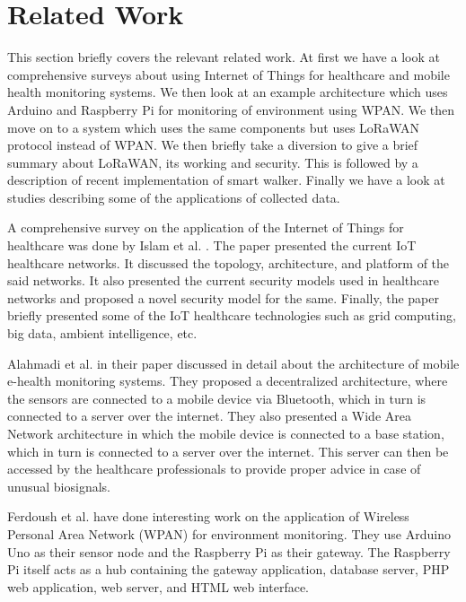 \chapter{Related Work}
\label{cha:related-work}

This section briefly covers the relevant related work. At first we have a look at comprehensive surveys about using Internet of Things for healthcare and mobile health monitoring systems. We then look at an example architecture which uses Arduino and Raspberry Pi for monitoring of environment using WPAN. We then move on to a system which uses the same components but uses LoRaWAN protocol instead of WPAN. We then briefly take a diversion to give a brief summary about LoRaWAN, its working and security. This is followed by a description of recent implementation of smart walker. Finally we have a look at studies describing some of the applications of collected data. 


A comprehensive survey on the application of the Internet of Things for healthcare was done by Islam et al. \cite{islam2015internet}. The paper presented the current IoT healthcare networks. It discussed the topology, architecture, and platform of the said networks. It also presented the current security models used in healthcare networks and proposed a novel security model for the same. Finally, the paper briefly presented some of the IoT healthcare technologies such as grid computing, big data, ambient intelligence, etc.

Alahmadi et al. \cite{alahmadi2011smart} in their paper discussed in detail about the architecture of mobile e-health monitoring systems. They proposed a decentralized architecture, where the sensors are connected to a mobile device via Bluetooth, which in turn is connected to a server over the internet. They also presented a Wide Area Network architecture in which the mobile device is connected to a base station, which in turn is connected to a server over the internet. This server can then be accessed by the healthcare professionals to provide proper advice in case of unusual biosignals.

Ferdoush et al. \cite{ferdoush2014wireless} have done interesting work on the application of Wireless Personal Area Network (WPAN) for environment monitoring. They use Arduino Uno as their sensor node and the Raspberry Pi as their gateway. The Raspberry Pi itself acts as a hub containing the gateway application, database server, PHP web application, web server, and HTML web interface.


